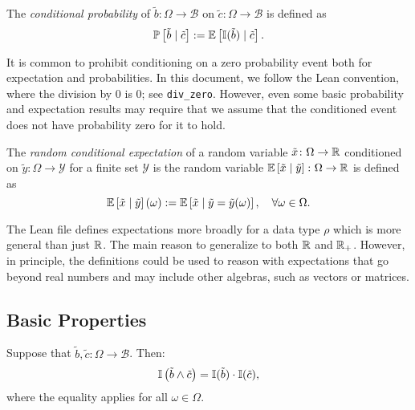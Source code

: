 \begin{definition} \label{def:probability_cnd}
The \emph{conditional probability} of $\tilde{b}\colon \Omega \to \mathcal{B}$ on $\tilde{c}\colon \Omega \to \mathcal{B}$ is defined as
\[
\mathbb{P}\left[ \tilde{b} \mid  \tilde{c} \right]  :=
\mathbb{E} \left[ \mathbb{I}(\tilde{b}) \mid  \tilde{c} \right].
\]
\end{definition}

\begin{remark}
It is common to prohibit conditioning on a zero probability event both for expectation and probabilities. In this document, we follow the Lean convention, where the division by $0$ is $0$; see \texttt{div\_zero}. However, even some basic probability and expectation results may require that we assume that the conditioned event does not have probability zero for it to hold. 
\end{remark}

\begin{definition} \label{def:expect-cnd-rv}
The \emph{random conditional expectation} of a random variable $\tilde{x} \colon \Omega \to \mathbb{R}$ conditioned on $\tilde{y} \colon \Omega \to \mathcal{Y}$ for a finite set $\mathcal{Y}$ is the random variable $\mathbb{E} \left[ \tilde{x} \mid  \tilde{y} \right]\colon \Omega \to \mathbb{R}$ is defined as
\[
\mathbb{E} \left[ \tilde{x} \mid  \tilde{y} \right](\omega)
:=
\mathbb{E} \left[ \tilde{x} \mid  \tilde{y} = \tilde{y}(\omega) \right], \quad \forall \omega \in \Omega.
\]
\end{definition}

\begin{remark}
The Lean file defines expectations more broadly for a data type $\rho$ which is more general than just $\mathbb{R}$. The main reason to generalize to both $\mathbb{R}$ and $\mathbb{R}_+$. However, in principle, the definitions could be used to reason with expectations that go beyond real numbers and may include other algebras, such as vectors or matrices.
\end{remark}

\subsection{Basic Properties}

\begin{lemma} \label{lem:ind-and-eq-prod-ind}
Suppose that $\tilde{b}, \tilde{c} \colon \Omega \to \mathcal{B}$. Then:
\[
\mathbb{I} \left( \tilde{b} \wedge \tilde{c} \right) = \mathbb{I} ( \tilde{b} ) \cdot  \mathbb{I} ( \tilde{c} ),  
\]
where the equality applies for all $\omega \in \Omega$.
\end{lemma}

